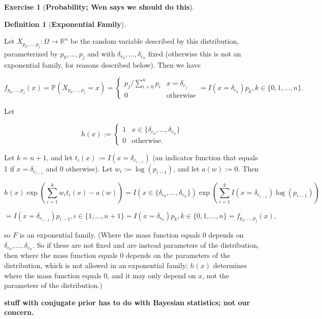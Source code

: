 \documentclass{article}
\theoremstyle{definition}
\newtheorem{exercise}{Exercise}
\newtheorem{definition}{Definition}
\theoremstyle{definition}
\theoremstyle{definition}
\theoremstyle{definition}
\begin{document}
\begin{exercise}[\textbf{Probability; Wen says we should do this}]
\begin{enumerate}[(a)]
\begin{center}
{{\begin{definition}[\textbf{Exponential Family}]
% 
% 
 
\end{definition}
}
}
\end{center}

Let \(X_{p_0, \ldots, p_j}: \Omega \to \mathbb{R}^n\) be the random variable described by this distribution, parameterized by \(p_0, \ldots, p_j\) and with \(\delta_{e_0}, \ldots, \delta_{e_n}\) fixed (otherwise this is not an exponential family, for reasons described below). Then we have

\[
f_{p_0, \ldots, p_j} (x) = \mathbb{P}(X_{p_0, \ldots, p_j} = x) = \begin{cases}
p_j/\sum_{i=0}^n p_i & x = \delta_{e_j} \\
0 & \text{otherwise}
\end{cases} =  I(x = \delta_{e_{k}}) p_{k}, k \in \{ 0, 1, \ldots, n\}.
\]

Let

\[
h(x) := \begin{cases}
1 & x \in \{\delta_{e_0}, \ldots, \delta_{e_n}\} \\
0 & \text{otherwise.}
\end{cases}
\]

Let \(k = n+1\), and let \(t_i(x) := I(x = \delta_{e_{i-1}})\) (an indicator function that equals 1 if \(x =  \delta_{e_{i-1}}\) and 0 otherwise). Let \(w_i := \log(p_{i-1})\), and let \(a(w) := 0\). Then

\[
 h(x) \exp \left( \sum_{i=1}^k w_i t_i(x) - a(w) \right) =  I(x \in \{\delta_{e_0}, \ldots, \delta_{e_n}\}) \exp \left( \sum_{i=1}^k I(x = \delta_{e_{i-1}}) \log(p_{i-1})  \right)
 \]
 
 \[
  = I(x = \delta_{e_{i-1}}) p_{i-1}, i \in \{ 1, \ldots, n + 1\} =  I(x = \delta_{e_{k}}) p_{k}, k \in \{ 0, 1, \ldots, n\} = f_{p_0, \ldots, p_j} (x),
\] 

so \(F\) is an exponential family. (Where the mass function equals 0 depends on \(\delta_{e_0}, \ldots, \delta_{e_n}\). So if these are not fixed and are instead parameters of the distribution, then where the mass function equals 0 depends on the parameters of the distribution, which is not allowed in an exponential family; \(h(x)\) determines where the mass function equals 0, and it may only depend on \(x\), not the parameters of the distribution.)

\textbf{stuff with conjugate prior has to do with Bayesian statistics; not our concern.}

\end{enumerate}

\end{exercise}
\end{document}
